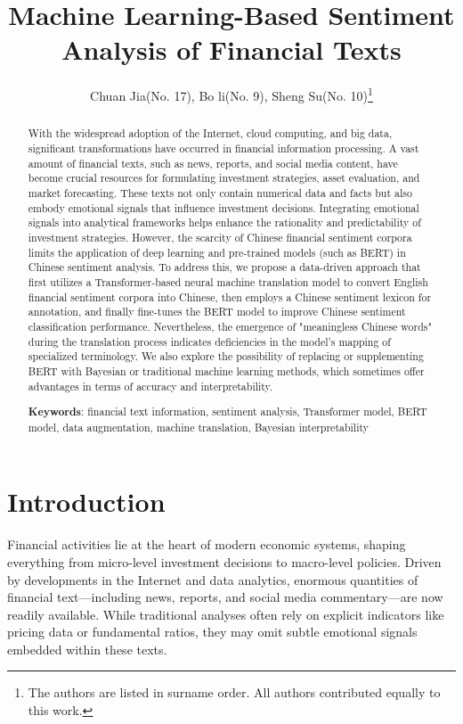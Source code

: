 \documentclass[12pt]{article}
\title{Machine Learning-Based Sentiment Analysis
of Financial Texts}
\author[1]{Chuan Jia(No. 17), Bo li(No. 9), Sheng Su(No. 10)\footnote{The authors are listed in surname order. All authors contributed equally to this work.}}
\date{}  %
\begin{document}
\maketitle

\begin{abstract}
With the widespread adoption of the Internet, cloud computing, and big data, significant transformations have occurred in financial information processing. A vast amount of financial texts, such as news, reports, and social media content, have become crucial resources for formulating investment strategies, asset evaluation, and market forecasting. These texts not only contain numerical data and facts but also embody emotional signals that influence investment decisions. Integrating emotional signals into analytical frameworks helps enhance the rationality and predictability of investment strategies. However, the scarcity of Chinese financial sentiment corpora limits the application of deep learning and pre-trained models (such as BERT) in Chinese sentiment analysis. To address this, we propose a data-driven approach that first utilizes a Transformer-based neural machine translation model to convert English financial sentiment corpora into Chinese, then employs a Chinese sentiment lexicon for annotation, and finally fine-tunes the BERT model to improve Chinese sentiment classification performance. Nevertheless, the emergence of "meaningless Chinese words" during the translation process indicates deficiencies in the model's mapping of specialized terminology. We also explore the possibility of replacing or supplementing BERT with Bayesian or traditional machine learning methods, which sometimes offer advantages in terms of accuracy and interpretability.

\textbf{Keywords}: financial text information, sentiment analysis, Transformer model, BERT model, data augmentation, machine translation, Bayesian interpretability
\end{abstract}


\section{Introduction}
\label{sec:intro}

Financial activities lie at the heart of modern economic systems, shaping everything from micro-level investment decisions to macro-level policies. Driven by developments in the Internet and data analytics, enormous quantities of financial text---including news, reports, and social media commentary---are now readily available. While traditional analyses often rely on explicit indicators like pricing data or fundamental ratios, they may omit subtle emotional signals embedded within these texts.
\end{document}
